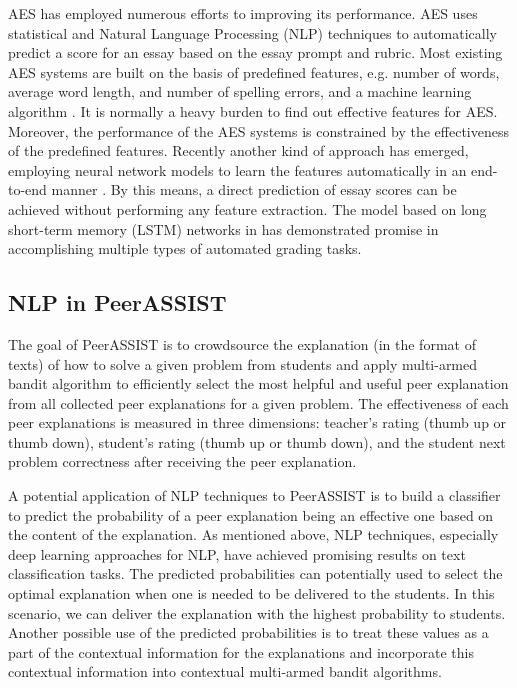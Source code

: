 \documentclass{article}
\begin{document}
AES has employed numerous efforts to improving its performance. AES uses statistical and Natural Language Processing (NLP) techniques to automatically predict a score for an essay based on the essay prompt and rubric. Most existing AES systems are built on the basis of predefined features, e.g. number of words, average word length, and number of spelling errors, and a machine learning algorithm \cite{Chen2013-zw}. It is normally a heavy burden to find out effective features for AES. Moreover, the performance of the AES systems is constrained by the effectiveness of the predefined features. Recently another kind of approach has emerged, employing neural network models to learn the features automatically in an end-to-end manner \cite{Taghipour2016-ns}. By this means, a direct prediction of essay scores can be achieved without performing any feature extraction. The model based on long short-term memory (LSTM) networks in \cite{Taghipour2016-ns} has demonstrated promise in accomplishing multiple types of automated grading tasks.

\subsection{NLP in PeerASSIST}
The goal of PeerASSIST is to crowdsource the explanation (in the
format of texts) of how to solve a
given problem from students and apply multi-armed bandit algorithm to
efficiently select the most helpful and useful peer explanation from all collected
peer explanations for a given problem. The effectiveness of each peer
explanations is measured in three dimensions: teacher's rating (thumb
up or thumb down), student's rating (thumb up or thumb down), and the
student next problem correctness after receiving the peer explanation.

A potential application of NLP techniques to PeerASSIST is to build a
classifier to predict the probability of a peer explanation being an
effective one based on the content of the explanation. As mentioned
above, NLP techniques, especially deep learning approaches for NLP,
have achieved promising results on text classification tasks. The
predicted probabilities can potentially used to select the optimal
explanation when one is needed to be delivered to the students. In
this scenario, we can deliver the explanation with the highest
probability to students. Another possible use of the predicted
probabilities is to treat these values as a part of the contextual
information for the explanations and incorporate this contextual
information into contextual multi-armed bandit algorithms.
\end{document}
